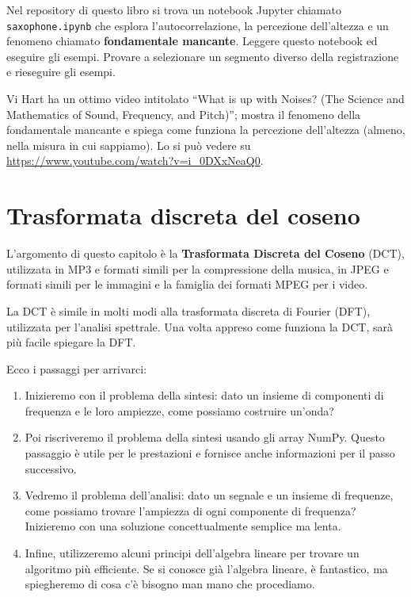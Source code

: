 \documentclass[12pt]{book} \usepackage[width=5.5in,height=8.5in, hmarginratio=3:2,vmarginratio=1:1]{geometry}
\begin{document}
\begin{exercise} Nel repository di questo libro si trova un notebook Jupyter chiamato \verb"saxophone.ipynb" che esplora l'autocorrelazione, la percezione dell'altezza e un fenomeno chiamato {\bf fondamentale mancante}. Leggere questo notebook ed eseguire gli esempi. Provare a selezionare un segmento diverso della registrazione e rieseguire gli esempi.

Vi Hart ha un ottimo video intitolato ``What is up with Noises? (The Science and Mathematics of Sound, Frequency, and Pitch)''; mostra il fenomeno della fondamentale mancante e spiega come funziona la percezione dell'altezza (almeno, nella misura in cui sappiamo). Lo si può vedere su \url{https://www.youtube.com/watch?v=i_0DXxNeaQ0}.

\end{exercise} 

\chapter{Trasformata discreta del coseno} \label{dct} 

L'argomento di questo capitolo è la {\bf Trasformata Discreta del Coseno} (DCT), utilizzata in MP3 e formati simili per la compressione della musica, in JPEG e formati simili per le immagini e la famiglia dei formati MPEG per i video.

La DCT è simile in molti modi alla trasformata discreta di Fourier (DFT), utilizzata per l'analisi spettrale. Una volta appreso come funziona la DCT, sarà più facile spiegare la DFT.

Ecco i passaggi per arrivarci:

\begin{enumerate} 

\item Inizieremo con il problema della sintesi: dato un insieme di componenti di frequenza e le loro ampiezze, come possiamo costruire un'onda?

\item Poi riscriveremo il problema della sintesi usando gli array NumPy. Questo passaggio è utile per le prestazioni e fornisce anche informazioni per il passo successivo.

\item Vedremo il problema dell'analisi: dato un segnale e un insieme di frequenze, come possiamo trovare l'ampiezza di ogni componente di frequenza? Inizieremo con una soluzione concettualmente semplice ma lenta.

\item Infine, utilizzeremo alcuni principi dell'algebra lineare per trovare un algoritmo più efficiente. Se si conosce già l'algebra lineare, è fantastico, ma spiegheremo di cosa c'è bisogno man mano che procediamo.

\end{enumerate} 
\end{document}
